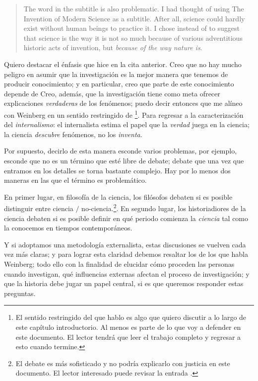 \begin{quote}
	The word  in the subtitle is also problematic.
	I had thought of using The Invention of Modern Science as a subtitle.
	After all, science could hardly exist without human beings to practice it.
	I chose  instead of  to suggest that science is the way it is not so much because of various adventitious historic acts of invention, but \emph{because of the way nature is}. \parencite[Prefacio, énfasis agregado]{Weinberg2015}
\end{quote}

Quiero destacar el énfasis que hice en la cita anterior.
Creo que no hay mucho peligro en asumir que la investigación es la mejor manera que tenemos de producir conocimiento; y en particular, creo que parte de este conocimiento depende de 
Creo, además, que la investigación tiene como meta ofrecer explicaciones \emph{verdaderas} de los fenómenos; puedo decir entonces que me alíneo con Weinberg en un sentido restringido de \footnote{
	El sentido restringido del que hablo es algo que quiero discutir a lo largo de este capítulo introductorio. Al menos es parte de lo que voy a defender en este documento.
	El lector tendrá que leer el trabajo completo y regresar a esto cuando termine.}.
Para regresar a la caracterización del \emph{internalismo}: el internalista estima el papel que la \emph{verdad} juega en la ciencia; la ciencia \emph{descubre} fenómenos, no los \emph{inventa}.

Por supuesto, decirlo de esta manera esconde varios problemas, por ejemplo, esconde que  no es un término que esté libre de debate; debate que una vez que entramos en los detalles se torna bastante complejo.
Hay por lo menos dos maneras en las que el término es problemático.

En primer lugar, en filosofía de la ciencia, los filósofos debaten si es posible distinguir entre ciencia $/$ no-ciencia.\footnote{El debate es más sofisticado y no podría explicarlo con justicia en este documento.
	El lector interesado puede revisar la entrada \parencite{sep-pseudo-science}.}.
En segundo lugar, los historiadiores de la ciencia debaten si es posible definir en qué periodo comienza la \emph{ciencia} tal como la conocemos en tiempos contemporáneos.

Y si adoptamos una metodología externalista, estas discusiones se vuelven cada vez más claras; y para lograr esta claridad debemos resaltar los  de los que habla Weinberg; todo ello con la finalidad de elucidar cómo proceden las personas cuando investigan, qué influencias externas afectan el proceso de investigación; y que la historia debe jugar un papel central, si es que queremos responder estas preguntas.


